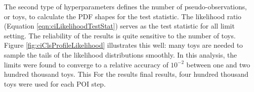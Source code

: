 The second type of hyperparameters defines the number of pseudo-observations, or toys, to calculate the PDF shapes for the test statistic.
The likelihood ratio (Equation \ref{eqn:ciLikelihoodTestStat}) serves as the test statistic for all limit setting.
The reliability of the results is quite sensitive to the number of toys.
Figure \ref{fig:ciClsProfileLikelihood} illustrates this well: many toys are needed to sample the tails of the likelihood distributions smoothly.
In this analysis, the limits were found to converge to a relative accuracy of $10^{-2}$ between one and two hundred thousand toys.
This 
For the results final results, four hundred thousand toys were used for each POI step.
